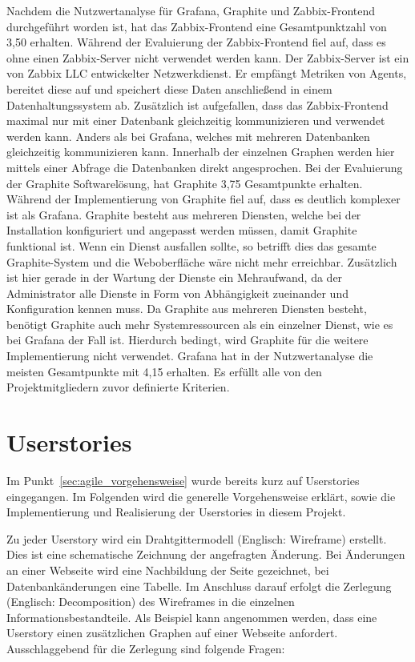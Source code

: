 Nachdem die Nutzwertanalyse für Grafana, Graphite und Zabbix-Frontend
durchgeführt worden ist, hat das Zabbix-Frontend eine Gesamtpunktzahl von 3,50
erhalten. Während der Evaluierung der Zabbix-Frontend fiel auf, dass es ohne
einen Zabbix-Server nicht verwendet werden kann. Der Zabbix-Server ist ein von
Zabbix LLC entwickelter Netzwerkdienst. Er empfängt Metriken von Agents,
bereitet diese auf und speichert diese Daten anschließend in einem
Datenhaltungssystem ab. Zusätzlich ist aufgefallen, dass das Zabbix-Frontend
maximal nur mit einer Datenbank gleichzeitig kommunizieren und verwendet werden
kann. Anders als bei Grafana, welches mit mehreren Datenbanken gleichzeitig
kommunizieren kann. Innerhalb der einzelnen Graphen werden hier mittels einer
Abfrage die Datenbanken direkt angesprochen. Bei der Evaluierung der Graphite
Softwarelösung, hat Graphite 3,75 Gesamtpunkte erhalten. Während der
Implementierung von Graphite fiel auf, dass es deutlich komplexer ist als
Grafana. Graphite besteht aus mehreren Diensten, welche bei der Installation
konfiguriert und angepasst werden müssen, damit Graphite funktional ist. Wenn
ein Dienst ausfallen sollte, so betrifft dies das gesamte Graphite-System und
die Weboberfläche wäre nicht mehr erreichbar. Zusätzlich ist hier gerade in der
Wartung der Dienste ein Mehraufwand, da der Administrator alle Dienste in Form
von Abhängigkeit zueinander und Konfiguration kennen muss. Da Graphite aus
mehreren Diensten besteht, benötigt Graphite auch mehr Systemressourcen als ein
einzelner Dienst, wie es bei Grafana der Fall ist. Hierdurch bedingt, wird
Graphite für die weitere Implementierung nicht verwendet. Grafana hat in der
Nutzwertanalyse die meisten Gesamtpunkte mit 4,15 erhalten. Es erfüllt alle von
den Projektmitgliedern zuvor definierte Kriterien.
\mr%

\chapter{Userstories}
Im Punkt~\ref{sec:agile_vorgehensweise} wurde bereits kurz auf Userstories
eingegangen. Im Folgenden wird die generelle Vorgehensweise erklärt, sowie die
Implementierung und Realisierung der Userstories in diesem Projekt.

Zu jeder Userstory wird ein Drahtgittermodell (Englisch: Wireframe) erstellt.
Dies ist eine schematische Zeichnung der angefragten Änderung. Bei Änderungen
an einer Webseite wird eine Nachbildung der Seite gezeichnet, bei
Datenbankänderungen eine Tabelle. Im Anschluss darauf erfolgt die Zerlegung
(Englisch: Decomposition) des Wireframes in die einzelnen
Informationsbestandteile. Als Beispiel kann angenommen werden, dass eine
Userstory einen zusätzlichen Graphen auf einer Webseite anfordert.
Ausschlaggebend für die Zerlegung sind folgende Fragen:

